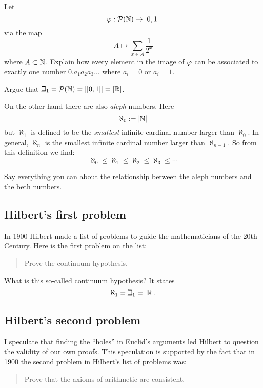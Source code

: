 \documentclass{ximera}
\begin{document}
\begin{question}
Let 
\[
\varphi: \mathcal{P}(\mathbb N) \to [0,1]
\]
via the map 
\[
A \mapsto \sum_{x\in A} \frac{1}{2^x}
\]
where $A\subset \mathbb N$. Explain how every element in the image of $\varphi$
can be associated to exactly one number $0.a_1a_2a_3\dots$ where $a_i=
0$ or $a_i=1$.
\end{question}

\begin{question}
Argue that $\beth_1 = \mathcal{P}(\mathbb N)= |[0,1]| = |\mathbb{R}|$.
\end{question}


On the other hand there are also \textit{aleph} numbers. Here
\[
\aleph_0 := |\mathbb N|
\]
but $\aleph_1$ is defined to be the \textit{smallest} infinite cardinal
number larger than $\aleph_0$. In general, $\aleph_n$ is the smallest
infinite cardinal number larger than $\aleph_{n-1}$. So from this
definition we find:
\[
\aleph_0 \le \aleph_1 \le \aleph_2 \le \aleph_3 \le \cdots
\]

\begin{question}
Say everything you can about the relationship between the aleph
numbers and the beth numbers.
\end{question}

\subsection*{Hilbert's first problem}


In 1900 Hilbert made a list of problems to guide the mathematicians
of the 20th Century. Here is the first problem on the list:

\begin{quote}
Prove the continuum hypothesis.
\end{quote}

What is this so-called continuum hypothesis? It states
\[
\aleph_1 = \beth_1 = |\mathbb{R}|.
\]

\subsection*{Hilbert's second problem}

I speculate that finding the ``holes'' in Euclid's arguments led
Hilbert to question the validity of our own proofs. This speculation
is supported by the fact that in 1900 the second problem in Hilbert's
list of problems was:
\begin{quote}
Prove that the axioms of arithmetic are consistent.
\end{quote}
\end{document}
